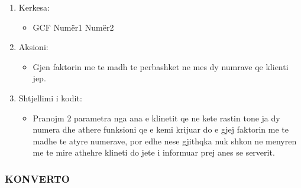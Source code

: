 \documentclass[]{article}
\begin{document}
\begin{enumerate}
\item Kerkesa:
\begin{itemize}
\item GCF  Numër1  Numër2
\end{itemize}
\item Aksioni:
\begin{itemize}
\item Gjen faktorin me te madh te perbashket ne mes dy numrave qe klienti jep.
\end{itemize}
\item Shtjellimi i kodit:
\begin{itemize}
\item Pranojm 2 parametra nga ana e klinetit qe ne kete rastin tone ja dy numera dhe athere funksioni qe e kemi krijuar do e gjej faktorin me te madhe te atyre numerave, por edhe nese gjithqka nuk shkon ne menyren me te mire athehre klineti do jete i informuar prej anes se serverit.
\end{itemize}
\end{enumerate}
\newpage
\subsubsection{KONVERTO}
\end{document}
